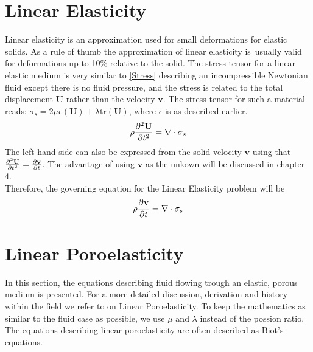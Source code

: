 \section{Linear Elasticity}
Linear elasticity is an approximation used for small deformations for elastic solids. As a rule of thumb the approximation of linear elasticity is usually valid for deformations up to 10\% relative to the solid. The stress tensor for a linear elastic medium is very similar to \eqref{Stress} describing an incompressible Newtonian fluid except there is no fluid pressure, and the stress is related to the total displacement $\mathbf{U}$ rather than the velocity $\mathbf{v}$. The stress tensor for such a material reads:
$\sigma_s = 2\mu\epsilon(\mathbf{U}) + \lambda \text{tr}(\mathbf{U})$, where $\epsilon$ is as described earlier. 
\begin{align} 
\rho \frac{\partial ^2\mathbf{U}}{\partial t^2} = \nabla \cdot \sigma_s \label{LE}
\end{align}
The left hand side can also be expressed from the solid velocity $\mathbf{v}$ using that $\frac{\partial ^2\mathbf{U}}{\partial t^2} = \frac{\partial \mathbf{v}}{\partial t} $. The advantage of using $\mathbf{v}$ as the unkown will be discussed in chapter 4.
\\
Therefore, the governing equation for the Linear Elasticity problem will be
\begin{align}
\rho \frac{\partial \mathbf{v}}{\partial t} = \nabla \cdot \sigma_s \label{LE2}
\end{align}
\section{Linear Poroelasticity}
In this section, the equations describing fluid flowing trough an elastic, porous medium is presented. For a more detailed discussion, derivation and history within the field we refer to \cite{Wang00} on Linear Poroelasticity. To keep the mathematics as similar to the fluid case as possible, we use $\mu$ and $\lambda$ instead of the possion ratio. The equations describing linear poroelasticity are often described as Biot's equations. 
\\
\\
